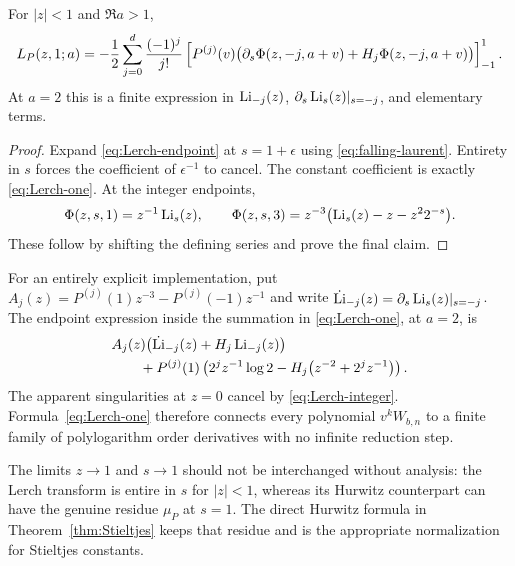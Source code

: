 \begin{proposition}\label{prop:Lerch-one}
For $|z|<1$ and $\Re a>1$,
\begin{equation}\label{eq:Lerch-one}
 L_P(z,1;a)=-\frac12\sum_{j=0}^d\frac{(-1)^j}{j!}
 \left[P^{(j)}(v)
 \bigl(\partial_s\Phi(z,-j,a+v)+H_j\Phi(z,-j,a+v)\bigr)\right]_{-1}^{1}.
\end{equation}
At $a=2$ this is a finite expression in $\operatorname{Li}_{-j}(z)$,
$\partial_s\operatorname{Li}_s(z)|_{s=-j}$, and elementary terms.
\end{proposition}
\begin{proof}
Expand \eqref{eq:Lerch-endpoint} at $s=1+\epsilon$ using
\eqref{eq:falling-laurent}. Entirety in $s$ forces the coefficient of
$\epsilon^{-1}$ to cancel. The constant coefficient is exactly
\eqref{eq:Lerch-one}. At the integer endpoints,
\begin{equation}\label{eq:Lerch-integer}
 \Phi(z,s,1)=z^{-1}\operatorname{Li}_s(z),\qquad
 \Phi(z,s,3)=z^{-3}\bigl(\operatorname{Li}_s(z)-z-z^22^{-s}\bigr).
\end{equation}
These follow by shifting the defining series and prove the final claim.
\end{proof}

For an entirely explicit implementation, put
$A_j(z)=P^{(j)}(1)z^{-3}-P^{(j)}(-1)z^{-1}$ and write
$\dot{\operatorname{Li}}_{-j}(z)=\partial_s\operatorname{Li}_s(z)|_{s=-j}$. The endpoint expression
inside the summation in \eqref{eq:Lerch-one}, at $a=2$, is
\begin{equation}\label{eq:Lerch-polylog-explicit}
\begin{split}
 &A_j(z)\bigl(\dot{\operatorname{Li}}_{-j}(z)+H_j\operatorname{Li}_{-j}(z)\bigr)\\
 &\qquad+P^{(j)}(1)
 \left(2^jz^{-1}\log2-H_j\bigl(z^{-2}+2^jz^{-1}\bigr)\right).
\end{split}
\end{equation}
The apparent singularities at $z=0$ cancel by
\eqref{eq:Lerch-integer}. Formula~\eqref{eq:Lerch-one} therefore
connects every polynomial $v^kW_{b,n}$ to a finite family of polylogarithm
order derivatives with no infinite reduction step.

The limits $z\to1$ and $s\to1$ should not be interchanged without
analysis: the Lerch transform is entire in $s$ for $|z|<1$, whereas its
Hurwitz counterpart can have the genuine residue $\mu_P$ at $s=1$.
The direct Hurwitz formula in Theorem~\ref{thm:Stieltjes} keeps that
residue and is the appropriate normalization for Stieltjes constants.
